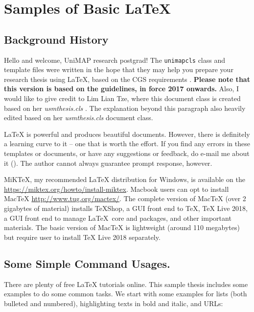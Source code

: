 \chapter{Samples of Basic \LaTeX{}}\label{chap:intro}

\section{Background History}
Hello and welcome, \ac{UniMAP} research postgrad!  The \verb|unimapcls| class and template files were written in the hope that they may help you prepare your research thesis using \LaTeX, based on the \ac{CGS} requirements \citep{cgs:thesis:guideline:2017}. \textbf{Please note that this version is based on the guidelines, in force 2017 onwards.} Also, I would like to give credit to Lim Lian Tze, where this document class is created based on her \emph{usmthesis.cls} \cite{lim:2007}. The explanation beyond this paragraph also heavily edited based on her \emph{usmthesis.cls} document class. 

\LaTeX{} is powerful and produces beautiful documents.  However, there is definitely a learning curve to it -- one that is worth the effort.  %
If you find any errors in these templates or documents, or have any suggestions or feedback, do e-mail me about it ().  The author cannot always guarantee prompt response, however. \Smiley

MiK\TeX{}, my recommended \LaTeX{} distribution for Windows, is available on the \url{https://miktex.org/howto/install-miktex}. Macbook users can opt to install MacTeX \url{http://www.tug.org/mactex/}. The complete version of MacTeX (over 2 gigabytes of material) installs TeXShop, a GUI front end to TeX, TeX Live 2018, a GUI front end to manage \LaTeX~core and packages, and other important materials. The basic version of MacTeX is lightweight (around 110 megabytes) but require user to install TeX Live 2018 separately.

\section{Some Simple Command Usages.}

There are plenty of free \LaTeX{} tutorials online.  This sample thesis includes some examples to do some common tasks.  We start with some examples for lists (both bulleted and numbered), highlighting texts in bold and italic, and URLs:

